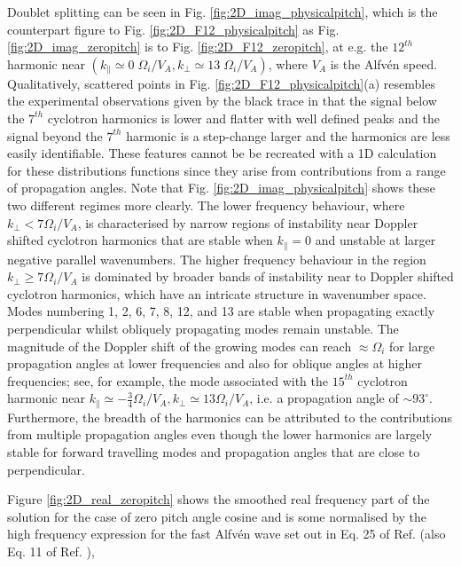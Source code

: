 \documentclass[12pt]{iopart}
\begin{document}
Doublet splitting can be seen in Fig. \ref{fig:2D_imag_physicalpitch}, which is the
counterpart figure to Fig. \ref{fig:2D_F12_physicalpitch} as Fig.
\ref{fig:2D_imag_zeropitch} is to Fig. \ref{fig:2D_F12_zeropitch},
at e.g. the $12^{th}$ harmonic  near $(k_\parallel \simeq 0\; \Omega_{i}/V_A,
k_\bot \simeq 13\; \Omega_{i}/V_A)$, where $V_A$ is the Alfv{\'e}n speed.
Qualitatively, scattered points in Fig.
\ref{fig:2D_F12_physicalpitch}(a) resembles the experimental observations given
by the black trace in that the
signal below the $7^{th}$ cyclotron harmonics is lower and flatter with well
defined peaks and the signal beyond the $7^{th}$ harmonic is a step-change
larger and the harmonics are less easily identifiable. These features cannot be
be recreated with a 1D calculation for these distributions functions
since they arise from contributions from a range of propagation angles.
Note that Fig. \ref{fig:2D_imag_physicalpitch} shows these two different regimes
more clearly. The lower frequency behaviour, where $k_\perp < 7 \Omega_i/V_A$, is
characterised by narrow regions of instability near Doppler shifted cyclotron
harmonics that are stable when $k_\parallel=0$ and unstable at larger
negative parallel wavenumbers. The higher frequency behaviour in the region
$k_\bot \geq 7\Omega_i/V_A$ is dominated by broader bands of instability
near to Doppler shifted cyclotron harmonics, which have
an intricate structure in wavenumber space. Modes numbering 1, 2, 6, 7, 8, 12, and
13 are stable when propagating exactly perpendicular whilst obliquely
propagating modes remain unstable. The magnitude of the Doppler shift of
the growing modes can reach $\approx \Omega_i$ for large propagation angles at 
lower frequencies and also for
oblique angles at higher frequencies; see, for example, the mode
associated with the $15^{th}$ cyclotron harmonic near $k_\parallel \simeq
-\frac{3}{4} \Omega_i/V_A, k_\perp \simeq 13 \Omega_i/V_A$, i.e. a propagation
angle of $\sim 93^\circ$. Furthermore, the breadth of the harmonics can be
attributed to the contributions from multiple propagation angles even though the
lower harmonics are largely stable for forward travelling modes and
propagation angles that are close to perpendicular.

Figure \ref{fig:2D_real_zeropitch}
shows the smoothed real frequency part of the solution for the case of
zero pitch angle cosine and is some normalised by
the high frequency expression for the fast Alfv{\'e}n wave set out in Eq.
25 of Ref. \cite{Dendy1994} (also Eq. 11 of Ref. \cite{McClements1996}),
\end{document}
